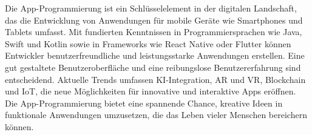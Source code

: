 \begin{kurzfassung*}
Die App-Programmierung ist ein Schlüsselelement in der digitalen Landschaft, das die Entwicklung von Anwendungen für mobile Geräte wie Smartphones und Tablets umfasst. Mit fundierten Kenntnissen in Programmiersprachen wie Java, Swift und Kotlin sowie in Frameworks wie React Native oder Flutter können Entwickler benutzerfreundliche und leistungsstarke Anwendungen erstellen. Eine gut gestaltete Benutzeroberfläche und eine reibungslose Benutzererfahrung sind entscheidend. Aktuelle Trends umfassen KI-Integration, AR und VR, Blockchain und IoT, die neue Möglichkeiten für innovative und interaktive Apps eröffnen. Die App-Programmierung bietet eine spannende Chance, kreative Ideen in funktionale Anwendungen umzusetzen, die das Leben vieler Menschen bereichern können.
\end{kurzfassung*}
